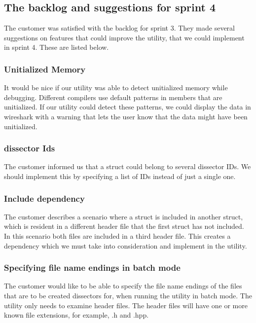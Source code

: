 \subsection{The backlog and suggestions for sprint 4}

The customer was satisfied with the backlog for sprint 3.
They made several suggestions on features that could improve the \gls{utility}, that we could implement in sprint 4.
These are listed below.

\subsubsection{Unitialized Memory}

It would be nice if our \gls{utility} was able to detect unitialized memory while debugging.
Different compilers use default patterns in \glspl{member} that are unitialized. If our \gls{utility} could detect these patterns,
we could display the data in \Gls{wireshark} with a warning that lets the user know that the data might have been unitialized.

\subsubsection{\Gls{dissector} Ids}

The customer informed us that a \gls{struct} could belong to several \gls{dissector} IDs.
We should implement this by specifying a list of IDs instead of just a single one.

\subsubsection{Include dependency}

The customer describes a scenario where a \gls{struct} is included in another \gls{struct}, which is resident in a different \gls{header} file
that the first \gls{struct} has not included. In this scenario both files are included in a third \gls{header} file.
This creates a dependency which we must take into consideration and implement in the \gls{utility}.

\subsubsection{Specifying file name endings in \gls{batch mode}}

The customer would like to be able to specify the file name endings of the files that are to be created \glspl{dissector} for,
when running the \gls{utility} in \gls{batch mode}. The \gls{utility} only needs to examine \gls{header} files. The \gls{header} files will have one or more known
file extensions, for example, .h and .hpp.

